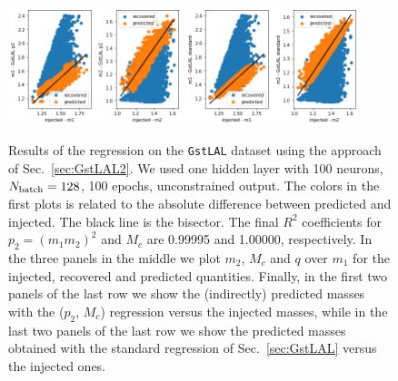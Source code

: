 \documentclass[prd,aps,twocolumn,a4paper,showkeys,nofootinbib]{revtex4-1}
\begin{document}
\begin{figure}[t]
  \includegraphics[width=0.45\textwidth]{./Figs/GstLAL_p2_m1m2.png}
  \hspace{1.3cm}
  \includegraphics[width=0.45\textwidth]{./Figs/GstLAL_standard_m1m2.png}
  \caption{\label{fig:GstLAL2_results} Results of the regression on the \texttt{GstLAL}
  dataset using the approach of Sec.~\ref{sec:GstLAL2}. 
  We used one hidden layer with 100 neurons, $N_{\rm batch}=128$, 100 epochs,  
  unconstrained output.
  The colors in the first plots is related to the absolute difference between predicted 
  and injected. The black line is the bisector.
  The final $R^2$ coefficients for $p_2=(m_1 m_2)^2$ and $M_c$ are 0.99995 and 1.00000,
  respectively.
  In the three panels in the middle we plot $m_2$, $M_c$ and $q$ over $m_1$ for 
  the injected, recovered and predicted quantities.
  Finally, in the first two panels of the last row we show the (indirectly) predicted masses 
  with the ($p_2$, $M_c$) regression versus the injected masses, 
  while in the last two panels of the last row we show the 
  predicted masses obtained with the standard regression of Sec.~\ref{sec:GstLAL} versus 
  the injected ones.}
\end{figure}


\end{document}

